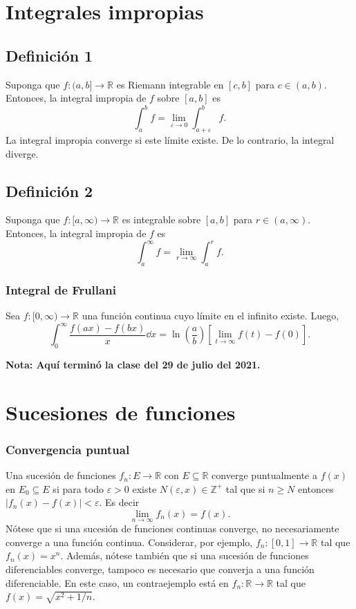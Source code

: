 \documentclass{article}
\begin{document}
\section*{Integrales impropias}

\subsection*{Definición 1}

Suponga que $f:(a,b]\to\mathbb{R}$ es Riemann integrable en $[c,b]$ para $c\in(a,b)$. Entonces, la integral impropia de $f$ sobre $[a,b]$ es
$$\int_a^b f=\lim_{\varepsilon\to 0}\int_{a+\varepsilon}^b f.$$
La integral impropia converge si este límite existe. De lo contrario, la integral diverge.

\subsection*{Definición 2}

Suponga que $f:[a,\infty)\to\mathbb{R}$ es integrable sobre $[a,b]$ para $r\in(a,\infty)$. Entonces, la integral impropia de $f$ es
$$\int_a^{\infty} f=\lim_{r\to \infty}\int_{a}^r f.$$

\subsubsection*{Integral de Frullani}

Sea $f:[0,\infty)\to\mathbb{R}$ una función continua cuyo límite en el infinito existe. Luego,
$$\int_0^{\infty}\frac{f(ax)-f(bx)}{x}\dd{x}=\ln\left(\frac{a}{b}\right)\left[\lim_{t\to\infty} f(t)-f(0)\right].$$

\vspace{10pt}
\textbf{Nota: Aquí terminó la clase del 29 de julio del 2021.}
\newpage

\section*{Sucesiones de funciones}

\subsubsection*{Convergencia puntual}

Una sucesión de funciones $f_n:E\to\mathbb{R}$ con $E\subseteq\mathbb{R}$ converge puntualmente a $f(x)$ en $E_0\subseteq E$ si para todo $\varepsilon>0$ existe $N(\varepsilon,x)\in\mathbb{Z}^+$ tal que si $n\geq N$ entonces $|f_n(x)-f(x)|<\varepsilon$. Es decir
$$\lim_{n\to\infty}f_n(x)=f(x).$$
Nótese que si una sucesión de funciones continuas converge, no necesariamente converge a una función continua. Considerar, por ejemplo, $f_n:[0,1]\to\mathbb{R}$ tal que $f_n(x)=x^n$. Además, nótese también que si una sucesión de funciones diferenciables converge, tampoco es necesario que converja a una función diferenciable. En este caso, un contraejemplo está en $f_n:\mathbb{R}\to\mathbb{R}$ tal que $f(x)=\sqrt{x^2+1/n}$.
\end{document}
